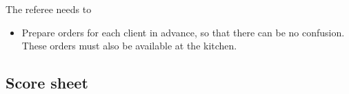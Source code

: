 The referee needs to
\begin{itemize}
  \item Prepare orders for each client in advance, so that there can be no confusion. These orders must also be available at the kitchen. 
\end{itemize}



\newpage
\subsection{Score sheet}


